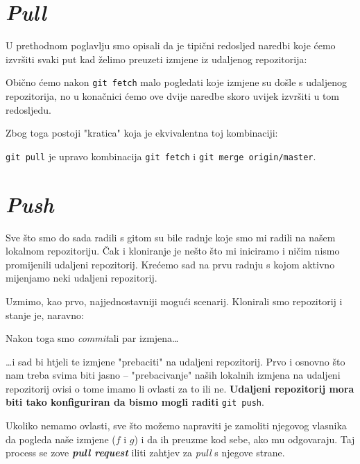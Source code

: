 

\section*{\emph{Pull}}

U prethodnom poglavlju smo opisali da je tipični redosljed naredbi koje ćemo izvršiti svaki put kad želimo preuzeti izmjene iz udaljenog repozitorija:


Obično ćemo nakon \verb+git fetch+ malo pogledati koje izmjene su došle s udaljenog repozitorija, no u konačnici ćemo ove dvije naredbe skoro uvijek izvršiti u tom redosljedu.

Zbog toga postoji "kratica" koja je ekvivalentna toj kombinaciji:


\verb+git pull+ je upravo kombinacija \verb+git fetch+ i \verb+git merge origin/master+.

\section*{\emph{Push}}

Sve što smo do sada radili s gitom su bile radnje koje smo mi radili na našem lokalnom repozitoriju.
Čak i kloniranje je nešto što mi iniciramo i ničim nismo promijenili udaljeni repozitorij.
Krećemo sad na prvu radnju s kojom aktivno mijenjamo neki udaljeni repozitorij.

Uzmimo, kao prvo, najjednostavniji mogući scenarij.
Klonirali smo repozitorij i stanje je, naravno:



Nakon toga smo \emph{commit}ali par izmjena\dots



\dots{}i sad bi htjeli te izmjene "prebaciti" na udaljeni repozitorij.
Prvo i osnovno što nam treba svima biti jasno -- "prebacivanje" naših lokalnih izmjena na udaljeni repozitorij ovisi o tome imamo li ovlasti za to ili ne.
\textbf{Udaljeni repozitorij mora biti tako konfiguriran da bismo mogli raditi} \verb+git push+.

Ukoliko nemamo ovlasti, sve što možemo napraviti je zamoliti njegovog vlasnika da pogleda naše izmjene ($f$ i $g$) i da ih preuzme kod sebe, ako mu odgovaraju.
Taj process se zove \textbf{\emph{pull request}} iliti zahtjev za \emph{pull} s njegove strane.

